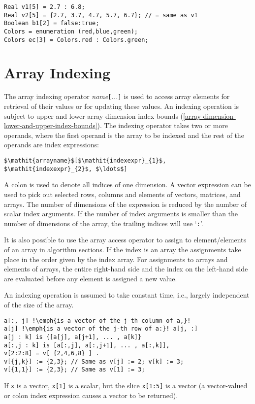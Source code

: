 \begin{example}
\begin{lstlisting}[language=modelica]
Real v1[5] = 2.7 : 6.8;
Real v2[5] = {2.7, 3.7, 4.7, 5.7, 6.7}; // = same as v1
Boolean b1[2] = false:true;
Colors = enumeration (red,blue,green);
Colors ec[3] = Colors.red : Colors.green;
\end{lstlisting}
\end{example}

\section{Array Indexing}\label{array-indexing}

The array indexing operator \emph{name}\lstinline![!\emph{...}\lstinline!]! is used to
access array elements for retrieval of their values or for updating
these values. An indexing operation is subject to upper and lower array
dimension index bounds (\cref{array-dimension-lower-and-upper-index-bounds}).  The indexing operator takes two or more
operands, where the first operand is the array to be indexed and the rest of the operands are index expressions:

\lstinline!$\mathit{arrayname}$[$\mathit{indexexpr}_{1}$, $\mathit{indexexpr}_{2}$, $\ldots$]!

A colon is used to denote all indices of one dimension. A vector
expression can be used to pick out selected rows, columns and elements
of vectors, matrices, and arrays. The number of dimensions of the
expression is reduced by the number of scalar index arguments. If the
number of index arguments is smaller than the number of dimensions of
the array, the trailing indices will use `\lstinline!:!'.

It is also possible to use the array access operator to assign to
element/elements of an array in algorithm sections. If the index is an
array the assignments take place in the order given by the index array.
For assignments to arrays and elements of arrays, the entire right-hand
side and the index on the left-hand side are evaluated before any
element is assigned a new value.

\begin{nonnormative}
An indexing operation is assumed to take constant time, i.e., largely independent of the size of the array.
\end{nonnormative}

\begin{example}
\begin{lstlisting}[language=modelica, escapechar=!]
a[:, j] !\emph{is a vector of the j-th column of a,}!
a[j] !\emph{is a vector of the j-th row of a:}! a[j, :]
a[j : k] is {[a[j], a[j+1], ... , a[k]}
a[:,j : k] is [a[:,j], a[:,j+1], ... , a[:,k]],
v[2:2:8] = v[ {2,4,6,8} ] .
v[{j,k}] := {2,3}; // Same as v[j] := 2; v[k] := 3;
v[{1,1}] := {2,3}; // Same as v[1] := 3;
\end{lstlisting}
If \lstinline!x! is a vector, \lstinline!x[1]! is a scalar, but the slice \lstinline!x[1:5]! is a vector
(a vector-valued or colon index expression causes a vector to be returned).
\end{example}

